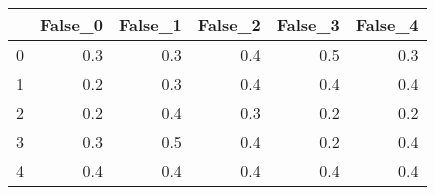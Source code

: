 \begin{tabular}{lrrrrr}
\toprule
{} &  False\_0 &  False\_1 &  False\_2 &  False\_3 &  False\_4 \\ \hline
\midrule
0 &      0.3 &      0.3 &      0.4 &      0.5 &      0.3 \\ \hline
1 &      0.2 &      0.3 &      0.4 &      0.4 &      0.4 \\ \hline
2 &      0.2 &      0.4 &      0.3 &      0.2 &      0.2 \\ \hline
3 &      0.3 &      0.5 &      0.4 &      0.2 &      0.4 \\ \hline
4 &      0.4 &      0.4 &      0.4 &      0.4 &      0.4 \\ \hline
\bottomrule
\end{tabular}
